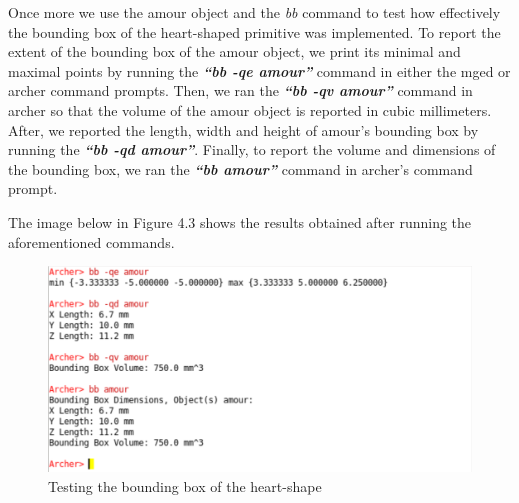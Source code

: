 \hspace{30} Once   more   we   use   the   amour   object   and   the   \textit{bb}   command   to   test   how  
effectively   the   bounding   box   of   the   heart­-shaped   primitive   was   implemented.  
To   report   the   extent   of   the   bounding   box   of   the   amour   object,   we   print   its  
minimal   and   maximal   points   by   running   the   \textit{\textbf{“bb   ­-qe   amour”}}   command   in   either  
the   mged   or   archer   command   prompts.   Then,   we   ran   the   \textit{\textbf{“bb   -­qv   amour”}}  
command   in   archer   so   that   the   volume   of   the   amour   object   is   reported   in   cubic  
millimeters.   After,   we   reported   the   length,   width   and   height   of   amour's   bounding  
box   by   running   the   \textit{\textbf{“bb   ­-qd   amour”}}.   Finally,   to   report   the   volume   and  
dimensions   of   the   bounding   box,   we   ran   the   \textit{\textbf{“bb   amour”}}   command   in   archer's  
command prompt. 

\hspace{30} The image below in Figure 4.3 shows the results obtained after running the aforementioned commands. 

\begin{figure}[htbp]
\centering
\includegraphics[trim=0.0cm 0.5cm 0.1cm 0.1cm, clip=true, totalheight=0.4\textheight]{Pictures/Bounding.png}
\caption[Testing the bounding box of the heart­-shape]{Testing the bounding box of the heart­-shape}
\label{Bounding}
\end{figure}

\clearpage


